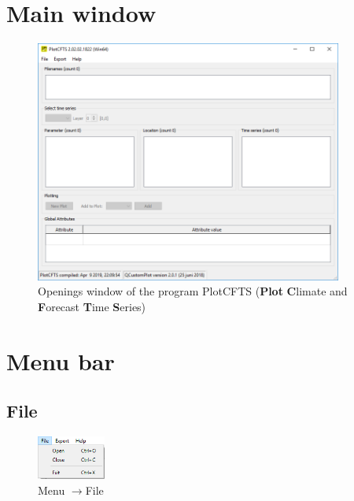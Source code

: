 \documentclass{deltares_memo}
\newcommand{\menuarrow}{$\rightarrow$}
\begin{document}
\section{Main window}
\phantom{m}\vspace{-\baselineskip}
\begin{figure}[H]
    \centering    
        \includegraphics[width=0.9\textwidth]{pictures/main.png}
    \caption{Openings window of the program PlotCFTS (\textbf{Plot} \textbf{C}limate and \textbf{F}orecast \textbf{T}ime \textbf{S}eries)}
\end{figure}

\section{Menu bar}

\subsection{File}
\phantom{m}\vspace{-\baselineskip}
\begin{figure}[H]
    \centering    
    \includegraphics[width=0.20\textwidth]{pictures/menu_file.png}
    \caption{Menu \menuarrow File}
\end{figure}
\end{document}
